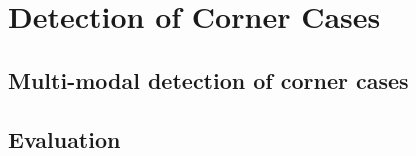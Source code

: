 \chapter{Detection of Corner Cases}
\label{chap:detection}

\section{Multi-modal detection of corner cases}
\label{sec:sensorik}

\section{Evaluation}

